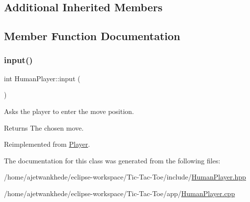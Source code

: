 \subsection*{Additional Inherited Members}


\subsection{Member Function Documentation}
\mbox{\label{classHumanPlayer_a8281fe260b25edc4451fd15ae182707f}} 
\subsubsection{\texorpdfstring{input()}{input()}}
{\footnotesize\ttfamily int Human\+Player\+::input (\begin{DoxyParamCaption}{ }\end{DoxyParamCaption})\hspace{0.3cm}{\ttfamily [virtual]}}



Asks the player to enter the move position. 

\begin{DoxyReturn}{Returns}
The chosen move. 
\end{DoxyReturn}


Reimplemented from \mbox{\hyperlink{classPlayer_a3e7c5ce7c59c8b5cc9d0b985a1baae91}{Player}}.



The documentation for this class was generated from the following files\+:\begin{DoxyCompactItemize}
\item 
/home/ajetwankhede/eclipse-\/workspace/\+Tic-\/\+Tac-\/\+Toe/include/\mbox{\hyperlink{HumanPlayer_8hpp}{Human\+Player.\+hpp}}\item 
/home/ajetwankhede/eclipse-\/workspace/\+Tic-\/\+Tac-\/\+Toe/app/\mbox{\hyperlink{HumanPlayer_8cpp}{Human\+Player.\+cpp}}\end{DoxyCompactItemize}
